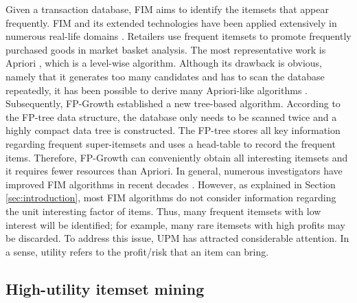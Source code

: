 \documentclass[journal]{IEEEtran}
\begin{document}
Given a transaction database, FIM aims to identify the itemsets that appear frequently. FIM and its extended technologies have been applied extensively in numerous real-life domains \cite{aggarwal2014frequent, agrawal1994fast, han2000mining, zaki2000scalable}. Retailers use frequent itemsets to promote frequently purchased goods in market basket analysis. The most representative work is Apriori \cite{agrawal1994fast}, which is a level-wise algorithm. Although its drawback is obvious, namely that it generates too many candidates and has to scan the database repeatedly, it has been possible to derive many Apriori-like algorithms \cite{liu2005two, pasquier1999discovering, szathmary2007towards}. Subsequently, FP-Growth \cite{han2000mining} established a new tree-based algorithm. According to the FP-tree data structure, the database only needs to be scanned twice and a highly compact data tree is constructed. The FP-tree stores all key information regarding frequent super-itemsets and uses a head-table to record the frequent items. Therefore, FP-Growth can conveniently obtain all interesting itemsets and it requires fewer resources than Apriori. In general, numerous investigators have improved FIM algorithms in recent decades \cite{aryabarzan2021neclatclosed, aryabarzan2018negfin, pei2007h, zaki2000scalable}. However, as explained in Section \ref{sec:introduction}, most FIM algorithms do not consider information regarding the unit interesting factor of items. Thus, many frequent itemsets with low interest will be identified; for example, many rare itemsets with high profits may be discarded. To address this issue, UPM \cite{gan2021survey} has attracted considerable attention. In a sense, utility refers to the profit/risk that an item can bring.


\subsection{High-utility itemset mining}
\end{document}

